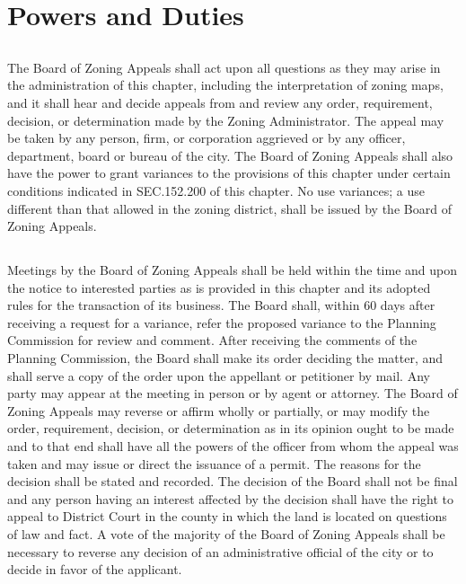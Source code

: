 \section{Powers and Duties}
\subsection{}
The Board of Zoning Appeals shall act upon all questions as they may arise in the administration of this chapter, including the interpretation of zoning maps, and it shall hear and decide appeals from and review any order, requirement, decision, or determination made by the Zoning Administrator. The appeal may be taken by any person, firm, or corporation aggrieved or by any officer, department, board or bureau of the city. The Board of Zoning Appeals shall also have the power to grant variances to the provisions of this chapter under certain conditions indicated in SEC.152.200 of this chapter. No use variances; a use different than that allowed in the zoning district, shall be issued by the Board of Zoning Appeals.
\subsection{}
Meetings by the Board of Zoning Appeals shall be held within the time and upon the notice to interested parties as is provided in this chapter and its adopted rules for the transaction of its business. The Board shall, within 60 days after receiving a request for a variance, refer the proposed variance to the Planning Commission for review and comment. After receiving the comments of the Planning Commission, the Board shall make its order deciding the matter, and shall serve a copy of the order upon the appellant or petitioner by mail. Any party may appear at the meeting in person or by agent or attorney. The Board of Zoning Appeals may reverse or affirm wholly or partially, or may modify the order, requirement, decision, or determination as in its opinion ought to be made and to that end shall have all the powers of the officer from whom the appeal was taken and may issue or direct the issuance of a permit. The reasons for the decision shall be stated and recorded.  The decision of the Board shall not be final and any person having an interest affected by the decision shall have the right to appeal to District Court in the county in which the land is located on questions of law and fact. A vote of the majority of the Board of Zoning Appeals shall be necessary to reverse any decision of an administrative official of the city or to decide in favor of the applicant.\\

